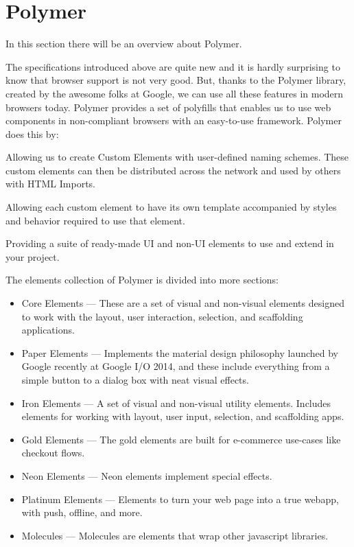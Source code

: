 \section{Polymer}
\label{sec:TCH_polymer}

In this section there will be an overview about Polymer.

The specifications introduced above are quite new and it is hardly surprising to know that browser support is not very good. But, thanks to the Polymer library, created by the awesome folks at Google, we can use all these features in modern browsers today. Polymer provides a set of polyfills that enables us to use web components in non-compliant browsers with an easy-to-use framework. Polymer does this by:

Allowing us to create Custom Elements with user-defined naming schemes. These custom elements can then be distributed across the network and used by others with HTML Imports.

Allowing each custom element to have its own template accompanied by styles and behavior required to use that element.

Providing a suite of ready-made UI and non-UI elements to use and extend in your project.

The elements collection of Polymer is divided into more sections:

\begin{itemize}

\item Core Elements — These are a set of visual and non-visual elements designed to work with the layout, user interaction, selection, and scaffolding applications.
\item Paper Elements — Implements the material design philosophy launched by Google recently at Google I/O 2014, and these include everything from a simple button to a dialog box with neat visual effects.
\item Iron Elements — A set of visual and non-visual utility elements. Includes elements for working with layout, user input, selection, and scaffolding apps.
\item Gold Elements — The gold elements are built for e-commerce use-cases like checkout flows.
\item Neon Elements — Neon elements implement special effects.
\item Platinum Elements — Elements to turn your web page into a true webapp, with push, offline, and more.
\item Molecules — Molecules are elements that wrap other javascript libraries.
\end{itemize}


